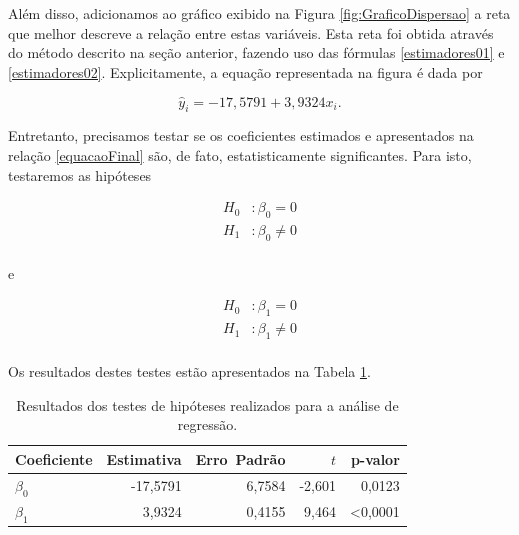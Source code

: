 \documentclass[a4paper,12pt,twoside,printwatermark=true]{modeloLEA}
\numberwithin{equation}{section}
\numberwithin{figure}{section}
\numberwithin{table}{section}
\begin{document}
Além disso, adicionamos ao gráfico exibido na Figura
\ref{fig:GraficoDispersao} a reta que melhor descreve a relação entre
estas variáveis. Esta reta foi obtida através do método descrito na
seção anterior, fazendo uso das fórmulas \eqref{estimadores01} e
\eqref{estimadores02}. Explicitamente, a equação representada na figura
é dada por

\begin{Shaded}
\begin{Highlighting}[]
\StringTok{ }\OperatorTok{~}\StringTok{ }
\end{Highlighting}
\end{Shaded}

\begin{equation}\label{equacaoFinal}
\widehat{y}_i = -17,5791 + 3,9324x_i.
\end{equation}

Entretanto, precisamos testar se os coeficientes estimados e
apresentados na relação \eqref{equacaoFinal} são, de fato,
estatisticamente significantes. Para isto, testaremos as hipóteses

\begin{align*}
H_0 &: \beta_0 = 0 \\
H_1 &: \beta_0 \neq 0 \\
\end{align*}

\noindent e

\begin{align*}
H_0 &: \beta_1 = 0 \\
H_1 &: \beta_1 \neq 0 \\
\end{align*}

\noindent Os resultados destes testes estão apresentados na Tabela
\ref{tab:Resultados}.

\begin{table}[!h]
\caption{\label{tab:Resultados} Resultados dos testes de hipóteses realizados para a análise de regressão.}
\begin{center}
\begin{tabular}{lrrrr}\hline
Coeficiente & \mbox{Estimativa} & \mbox{Erro Padrão} &   $t$  & \mbox{p-valor} \\ \hline
$\beta_0$   & -17,5791   &    6,7584   & -2,601 &  0,0123  \\
$\beta_1$   &   3,9324   &    0,4155   & 9,464  & <0,0001  \\ \hline
\end{tabular}
\end{center}
\end{table}
\end{document}
